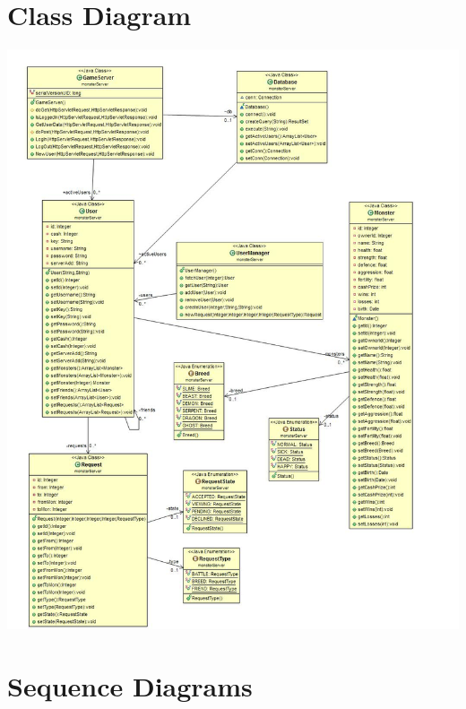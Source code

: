 \documentclass{project}
\begin{document}
\section{Class Diagram}
\includegraphics[scale=0.40]{MonsterMashClassesv1_1.jpg}

\section{Sequence Diagrams}
\end{document}
